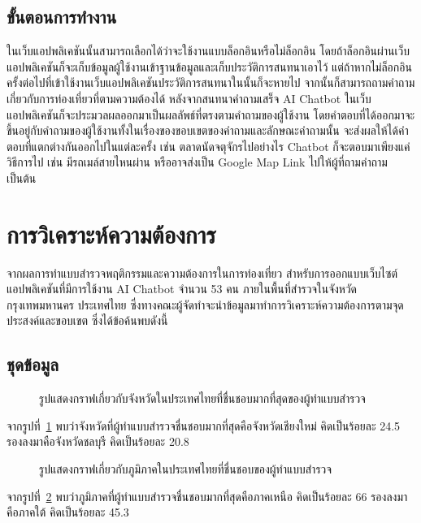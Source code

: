 \documentclass[12pt,oneside,openright,a4paper]{cpe-thai-project}
\begin{document}
\subsection{ขั้นตอนการทำงาน}
ในเว็บแอปพลิเคชันนั้นสามารถเลือกได้ว่าจะใช้งานแบบล็อกอินหรือไม่ล็อกอิน โดยถ้าล็อกอินผ่านเว็บแอปพลิเคชันก็จะเก็บข้อมูลผู้ใช้งานเข้าฐานข้อมูลและเก็บประวัติการสนทนาเอาไว้ แต่ถ้าหากไม่ล็อกอินครั้งต่อไปที่เข้าใช้งานเว็บแอปพลิเคชันประวัติการสนทนาในนั้นก็จะหายไป จากนั้นก็สามารถถามคำถามเกี่ยวกับการท่องเที่ยวที่ตามความต้องได้ หลังจากสนทนาคำถามเสร็จ AI Chatbot ในเว็บแอปพลิเคชันก็จะประมวลผลออกมาเป็นผลลัพธ์ที่ตรงตามคำถามของผู้ใช้งาน โดยคำตอบที่ได้ออกมาจะขึ้นอยู่กับคำถามของผู้ใช้งานทั้งในเรื่องของขอบเขตของคำถามและลักษณะคำถามนั้น จะส่งผลให้ได้คำตอบที่แตกต่างกันออกไปในแต่ละครั้ง เช่น ตลาดนัดจตุจักรไปอย่างไร Chatbot ก็จะตอบมาเพียงแค่วิธีการไป เช่น มีรถเมล์สายไหนผ่าน หรืออาจส่งเป็น Google Map Link ไปให้ผู้ที่ถามคำถาม เป็นต้น

\section{การวิเคราะห์ความต้องการ}
จากผลการทำแบบสำรวจพฤติกรรมและความต้องการในการท่องเที่ยว สำหรับการออกแบบเว็บไซต์แอปพลิเคชันที่มีการใช้งาน AI Chatbot จำนวน 53 คน ภายในพื้นที่สำรวจในจังหวัดกรุงเทพมหานคร ประเทศไทย 
ซึ่งทางคณะผู้จัดทำจะนำข้อมูลมาทำการวิเคราะห์ความต้องการตามจุดประสงค์และขอบเขต ซึ่งได้ข้อค้นพบดังนี้
\subsection{ชุดข้อมูล}

\begin{figure}[!h]\centering
\setlength{\fboxrule}{0mm}
\caption{รูปแสดงกราฟเกี่ยวกับจังหวัดในประเทศไทยที่ชื่นชอบมากที่สุดของผู้ทำแบบสำรวจ}\label{fig:F3.1}
\end{figure}
จากรูปที่~\ref{fig:F3.1} พบว่าจังหวัดที่ผู้ทำแบบสำรวจชื่นชอบมากที่สุดคือจังหวัดเชียงใหม่ คิดเป็นร้อยละ 24.5 รองลงมาคือจังหวัดชลบุรี คิดเป็นร้อยละ 20.8

\begin{figure}[!h]\centering
\setlength{\fboxrule}{0mm}
\caption{รูปแสดงกราฟเกี่ยวกับภูมิภาคในประเทศไทยที่ชื่นชอบของผู้ทำแบบสำรวจ}\label{fig:F3.2}
\end{figure}
จากรูปที่~\ref{fig:F3.2} พบว่าภูมิภาคที่ผู้ทำแบบสำรวจชื่นชอบมากที่สุดคือภาคเหนือ คิดเป็นร้อยละ 66 รองลงมาคือภาคใต้ คิดเป็นร้อยละ 45.3 \\
\end{document}
